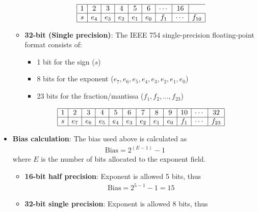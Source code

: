 \documentclass{report}
\begin{document}
\begin{itemize}
\begin{itemize}
                \[
                    \begin{array}{|c|c|c|c|c|c|c|c|c|c|c|c|c|c|}
                        \hline
                        1 & 2 & 3 & 4 & 5 & 6 & \cdots & 16 \\
                        \hline
                        s & e_4 & e_3 & e_2 & e_1 & e_0 & f_1 & \cdots & f_{10} \\
                        \hline
                    \end{array}
                \]
            \item \textbf{32-bit (Single precision)}: The IEEE 754 single-precision floating-point format consists of:
                \begin{itemize}
                    \item 1 bit for the sign (\(s\))
                    \item 8 bits for the exponent (\(e_7, e_6, e_5, e_4, e_3, e_2, e_1, e_0\))
                    \item 23 bits for the fraction/mantissa (\(f_1, f_2, \ldots, f_{23}\))
                \end{itemize}
                \[
                    \begin{array}{|c|c|c|c|c|c|c|c|c|c|c|c|c|c|}
                        \hline
                        1 & 2 & 3 & 4 & 5 & 6 & 7 & 8 & 9 & 10 & \cdots & 32 \\
                        \hline
                        s & e_7 & e_6 & e_5 & e_4 & e_3 & e_2 & e_1 & e_0 & f_1 & \cdots & f_{23} \\
                        \hline
                    \end{array}
                \]
        \end{itemize}
    \item \textbf{Bias calculation}: The bias used above is calculated as 
        \begin{align*}
            \text{Bias} = 2^{(E-1)} -1
        \end{align*}
        where $E$ is the number of bits allocated to the exponent field.
        \bigbreak \noindent 
        \begin{itemize}
            \item \textbf{16-bit half precision}: Exponent is allowed 5 bits, thus
                \begin{align*}
                    \text{Bias} = 2^{5-1} - 1 = 15
                \end{align*}
            \item \textbf{32-bit single precision}: Exponent is allowed 8 bits, thus

\end{itemize}
\end{itemize}
\end{document}

